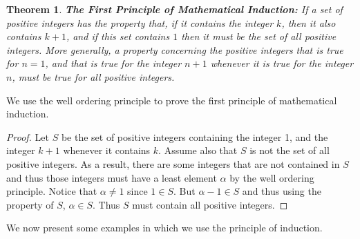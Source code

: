 \documentclass[12pt,letterpaper]{book}
\newtheorem{theorem}{Theorem}
\begin{document}
\begin{theorem}
\textbf{The First Principle of Mathematical Induction:}  If a set of
positive integers has the property that, if it contains the integer
$k$, then it also contains $k+1$, and if this set contains $1$ then it
must be the set of all positive integers. More generally, a property
concerning the positive integers that is true for $n=1$, and that is
true for the integer $n+1$ whenever it is true for the integer $n$,
must be true for all positive integers.
\end{theorem}

We use the well ordering principle to prove the first principle of
mathematical induction.

\begin{proof}
Let $S$ be the set of positive integers containing the integer 1,
and the integer $k+1$ whenever it contains $k$.  Assume also that
$S$ is not the set of all positive integers.  As a result, there are
some integers that are not contained in $S$ and thus those integers
must have a least element $\alpha$ by the well ordering principle.
Notice that $\alpha \neq 1$ since $1\in S$. But $\alpha-1 \in S$ and
thus using the property of $S$, $\alpha \in S$.  Thus $S$ must
contain all positive integers.
\end{proof}

 We now present some examples in which we use the principle of
induction.
\end{document}
